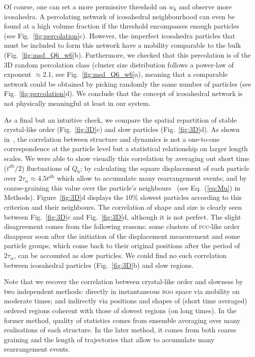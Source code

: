 Of course, one can set a more permissive threshold on $w_6$ and observe more icosahedra. A percolating network of icosahedral neighbourhood can even be found at a high volume fraction if the threshold encompasses enough particles (see Fig.~\ref{fig:percolation}c). However, the imperfect icosahedra particles that must be included to form this network have a mobility comparable to the bulk (Fig.~\ref{fig:msd_Q6_w6}b). Furthermore, we checked that this percolation is of the 3D random percolation class (cluster size distribution follows a power-law of exponent $\approx 2.1$, see Fig.~\ref{fig:msd_Q6_w6}a), meaning that a comparable network could be obtained by picking randomly the same number of particles (see Fig.~\ref{fig:percolation}d). We conclude that the concept of icosahedral network is not physically meaningful at least in our system.

As a final but an intuitive check, we compare the spatial repartition of stable crystal-like order (Fig.~\ref{fig:3D}c) and slow particles (Fig.~\ref{fig:3D}d). As shown in~\citep{Berthier2007}, the correlation between structure and dynamics is not a one-to-one correspondence at the particle level but a statistical relationship on larger length scales. We were able to show visually this correlation by averaging out short time ($t^{dh}/2$) fluctuations of $Q_6$; by calculating the square displacement of each particle over $2\tau_\alpha\approx 4.5t^{dh}$ which allow to accumulate many rearrangement events; and by coarse-graining this value over the particle's neighbours~\citep{Berthier2007} (see Eq.~(\ref{eq:Mu}) in Methods). Figure~\ref{fig:3D}d displays the $10\%$ slowest particles according to this criterion and their neighbours. The correlation of shape and size is clearly seen between Fig.~\ref{fig:3D}c and Fig.~\ref{fig:3D}d, although it is not perfect. The slight disagreement comes from the following reasons: some clusters of \textsc{fcc}-like order disappear soon after the initiation of the displacement measurement and some particle groups, which come back to their original positions after the period of $2\tau_\alpha$, can be accounted as slow particles. We could find no such correlation between icosahedral particles (Fig.~\ref{fig:3D}b) and slow regions.

Note that we recover the correlation between crystal-like order and slowness by two independent methods: directly in instantaneous \textsc{boo} space via mobility on moderate times; and indirectly via positions and shapes of (short time averaged) ordered regions coherent with those of slowest regions (on long times). In the former method, quality of statistics comes from ensemble averaging over many realisations of each structure. In the later method, it comes from both coarse graining and the length of trajectories that allow to accumulate many rearrangement events.


